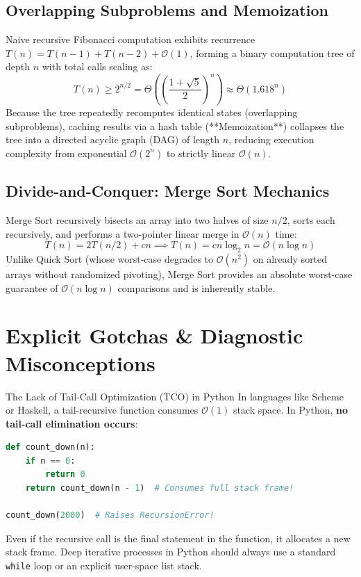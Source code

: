 \subsection{Overlapping Subproblems and Memoization}
Naive recursive Fibonacci computation exhibits recurrence $T(n) = T(n-1) + T(n-2) + \mathcal{O}(1)$, forming a binary computation tree of depth $n$ with total calls scaling as:
\begin{equation}
T(n) \ge 2^{n/2} = \Theta\left(\left(\frac{1 + \sqrt{5}}{2}\right)^n\right) \approx \Theta(1.618^n)
\end{equation}
Because the tree repeatedly recomputes identical states (overlapping subproblems), caching results via a hash table (**Memoization**) collapses the tree into a directed acyclic graph (DAG) of length $n$, reducing execution complexity from exponential $\mathcal{O}(2^n)$ to strictly linear $\mathcal{O}(n)$.

\subsection{Divide-and-Conquer: Merge Sort Mechanics}
Merge Sort recursively bisects an array into two halves of size $n/2$, sorts each recursively, and performs a two-pointer linear merge in $\mathcal{O}(n)$ time:
\begin{equation}
T(n) = 2 T(n/2) + c n \implies T(n) = c n \log_2 n = \mathcal{O}(n \log n)
\end{equation}
Unlike Quick Sort (whose worst-case degrades to $\mathcal{O}(n^2)$ on already sorted arrays without randomized pivoting), Merge Sort provides an absolute worst-case guarantee of $\mathcal{O}(n \log n)$ comparisons and is inherently stable.

\section{Explicit Gotchas \& Diagnostic Misconceptions}

\begin{trapbox}{The Lack of Tail-Call Optimization (TCO) in Python}
In languages like Scheme or Haskell, a tail-recursive function consumes $\mathcal{O}(1)$ stack space. In Python, \textbf{no tail-call elimination occurs}:
\begin{lstlisting}[language=Python]
def count_down(n):
    if n == 0:
        return 0
    return count_down(n - 1)  # Consumes full stack frame!

count_down(2000)  # Raises RecursionError!
\end{lstlisting}
Even if the recursive call is the final statement in the function, it allocates a new stack frame. Deep iterative processes in Python should always use a standard \texttt{while} loop or an explicit user-space list stack.
\end{trapbox}

